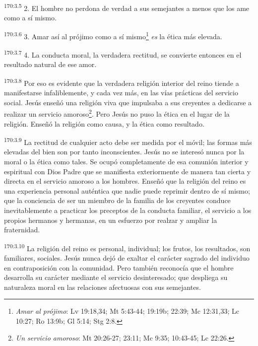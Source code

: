 \par
\textsuperscript{170:3.5} 2. El hombre no perdona de verdad a sus semejantes a menos que los ame como a sí mismo.

\par
\textsuperscript{170:3.6} 3. Amar así al prójimo como a sí mismo\footnote{\textit{Amar al prójimo}: Lv 19:18,34; Mt 5:43-44; 19:19b; 22:39; Mc 12:31,33; Lc 10:27; Ro 13:9b; Gl 5:14; Stg 2:8.} \textit{es} la ética más elevada.

\par
\textsuperscript{170:3.7} 4. La conducta moral, la verdadera rectitud, se convierte entonces en el resultado natural de ese amor.

\par
\textsuperscript{170:3.8} Por eso es evidente que la verdadera religión interior del reino tiende a manifestarse infaliblemente, y cada vez más, en las vías prácticas del servicio social. Jesús enseñó una religión viva que impulsaba a sus creyentes a dedicarse a realizar un servicio amoroso\footnote{\textit{Un servicio amoroso}: Mt 20:26-27; 23:11; Mc 9:35; 10:43-45; Lc 22:26.}. Pero Jesús no puso la ética en el lugar de la religión. Enseñó la religión como causa, y la ética como resultado.

\par
\textsuperscript{170:3.9} La rectitud de cualquier acto debe ser medida por el móvil; las formas más elevadas del bien son por tanto inconscientes. Jesús no se interesó nunca por la moral o la ética como tales. Se ocupó completamente de esa comunión interior y espiritual con Dios Padre que se manifiesta exteriormente de manera tan cierta y directa en el servicio amoroso a los hombres. Enseñó que la religión del reino es una experiencia personal auténtica que nadie puede reprimir dentro de sí mismo; que la conciencia de ser un miembro de la familia de los creyentes conduce inevitablemente a practicar los preceptos de la conducta familiar, el servicio a los propios hermanos y hermanas, en un esfuerzo por realzar y ampliar la fraternidad.

\par
\textsuperscript{170:3.10} La religión del reino es personal, individual; los frutos, los resultados, son familiares, sociales. Jesús nunca dejó de exaltar el carácter sagrado del individuo en contraposición con la comunidad. Pero también reconocía que el hombre desarrolla su carácter mediante el servicio desinteresado; que despliega su naturaleza moral en las relaciones afectuosas con sus semejantes.

